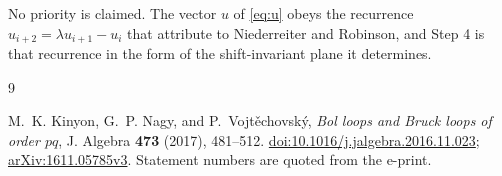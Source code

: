 \documentclass[11pt]{amsart}
\theoremstyle{definition}
\begin{document}
No priority is claimed. The vector $u$ of \eqref{eq:u} obeys the recurrence
$u_{i+2}=\lambda u_{i+1}-u_i$ that \cite{KNV} attribute to Niederreiter and
Robinson, and Step 4 is that recurrence in the form of the shift-invariant plane
it determines.

\begin{thebibliography}{9}

M.~K. Kinyon, G.~P. Nagy, and P.~Vojt\v{e}chovsk\'y,
\emph{Bol loops and Bruck loops of order $pq$},
J. Algebra \textbf{473} (2017), 481--512.
\href{https://doi.org/10.1016/j.jalgebra.2016.11.023}{doi:10.1016/j.jalgebra.2016.11.023};
\href{https://arxiv.org/abs/1611.05785}{arXiv:1611.05785v3}. Statement numbers
are quoted from the e-print.

\end{thebibliography}
\end{document}
